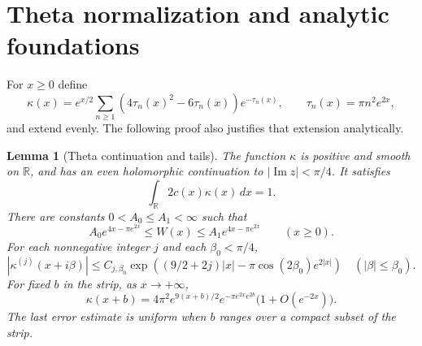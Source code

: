 \documentclass[11pt,a4paper]{article}
\numberwithin{equation}{section}
\newtheorem{lemma}[theorem]{Lemma}
\theoremstyle{definition}
\theoremstyle{remark}
\newcommand{\R}{\mathbb R}
\begin{document}
\section{Theta normalization and analytic foundations}\label{sec:theta}

For $x\ge0$ define
\begin{equation}\label{eq:kappa-series}
 \kappa(x)=e^{x/2}\sum_{n\ge1}(4\tau_n(x)^2-6\tau_n(x))e^{-\tau_n(x)},
 \qquad \tau_n(x)=\pi n^2e^{2x},
\end{equation}
and extend evenly. The following proof also justifies that extension analytically.

\begin{lemma}[Theta continuation and tails]\label{lem:theta-tails}
The function $\kappa$ is positive and smooth on $\R$, and has an even holomorphic continuation to $|\operatorname{Im}z|<\pi/4$. It satisfies
\begin{equation}\label{eq:normalization}
 \int_\R 2c(x)\kappa(x)\,dx=1.
\end{equation}
There are constants $0<A_0\le A_1<\infty$ such that
\begin{equation}\label{eq:W-two-sided}
 A_0 e^{4x-\pi e^{2x}}\le W(x)\le A_1 e^{4x-\pi e^{2x}}
 \qquad(x\ge0).
\end{equation}
For each nonnegative integer $j$ and each $\beta_0<\pi/4$,
\begin{equation}\label{eq:strip-upper}
 |\kappa^{(j)}(x+i\beta)|\le C_{j,\beta_0}
 \exp\!\left((9/2+2j)|x|-\pi\cos(2\beta_0)e^{2|x|}\right)
 \quad(|\beta|\le\beta_0).
\end{equation}
For fixed $b$ in the strip, as $x\to+\infty$,
\begin{equation}\label{eq:complex-asymptotic}
 \kappa(x+b)=4\pi^2e^{9(x+b)/2}e^{-\pi e^{2x}e^{2b}}
 \bigl(1+O(e^{-2x})\bigr).
\end{equation}
The last error estimate is uniform when $b$ ranges over a compact subset of the strip.
\end{lemma}
\end{document}
